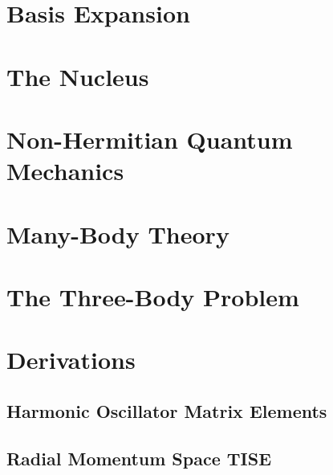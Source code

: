 \documentclass[12pt,a4paper]{report}
\begin{document}
\chapter{Basis Expansion}
\label{cha:basis expansion}


\chapter{The  Nucleus}
\label{cha:he5}


\chapter{Non-Hermitian Quantum Mechanics} 
\label{cha:nhqm}



\chapter{Many-Body Theory}
\label{cha:many-body}



\chapter{The Three-Body Problem}
\label{cha:three-body}


% 
% 
% 

\appendix


\chapter{Derivations}

\section{Harmonic Oscillator Matrix Elements}
\label{sec:HO matrix elements}



\section{Radial Momentum Space TISE}
\label{sec:radial mom space TISE}




{}
\end{document}
